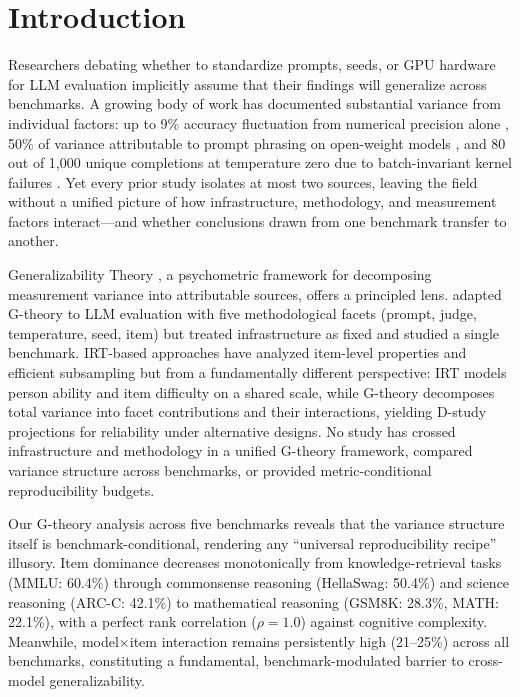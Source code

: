 \documentclass[letterpaper]{article}
\newcommand{\pct}{\%}
\begin{document}
\section{Introduction}

Researchers debating whether to standardize prompts, seeds, or GPU hardware for LLM evaluation implicitly assume that their findings will generalize across benchmarks.
A growing body of work has documented substantial variance from individual factors: up to 9\pct{} accuracy fluctuation from numerical precision alone \citep{yuan2025}, 50\pct{} of variance attributable to prompt phrasing on open-weight models \citep{brittlebench2026}, and 80 out of 1,000 unique completions at temperature zero due to batch-invariant kernel failures \citep{thinkingmachines2025}.
Yet every prior study isolates at most two sources, leaving the field without a unified picture of how infrastructure, methodology, and measurement factors interact---and whether conclusions drawn from one benchmark transfer to another.

Generalizability Theory \citep{shavelson1991,brennan2001}, a psychometric framework for decomposing measurement variance into attributable sources, offers a principled lens.
\citet{mesting2026} adapted G-theory to LLM evaluation with five methodological facets (prompt, judge, temperature, seed, item) but treated infrastructure as fixed and studied a single benchmark.
IRT-based approaches \citep{lalor2019,rodriguez2021,polo2024} have analyzed item-level properties and efficient subsampling but from a fundamentally different perspective: IRT models person ability and item difficulty on a shared scale, while G-theory decomposes total variance into facet contributions and their interactions, yielding D-study projections for reliability under alternative designs.
No study has crossed infrastructure and methodology in a unified G-theory framework, compared variance structure across benchmarks, or provided metric-conditional reproducibility budgets.

Our G-theory analysis across five benchmarks reveals that the variance structure itself is benchmark-conditional, rendering any ``universal reproducibility recipe'' illusory.
Item dominance decreases monotonically from knowledge-retrieval tasks (MMLU: 60.4\pct{}) through commonsense reasoning (HellaSwag: 50.4\pct{}) and science reasoning (ARC-C: 42.1\pct{}) to mathematical reasoning (GSM8K: 28.3\pct{}, MATH: 22.1\pct{}), with a perfect rank correlation ($\rho=1.0$) against cognitive complexity.
Meanwhile, model$\times$item interaction remains persistently high (21--25\pct{}) across all benchmarks, constituting a fundamental, benchmark-modulated barrier to cross-model generalizability.
\end{document}
